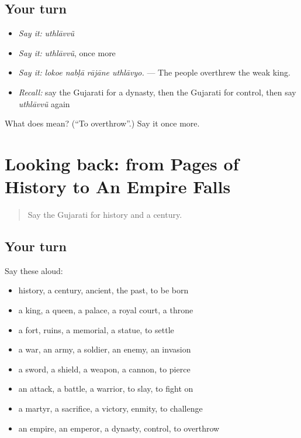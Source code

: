 \subsection*{Your turn}
\begin{itemize}
\raggedright
  \item \emph{Say it:} \emph{uthlāvvũ}
  \item \emph{Say it:} \emph{uthlāvvũ}, once more
  \item \emph{Say it:} \emph{lokoe nabḷā rājāne uthlāvyo.} — The people overthrew the weak king.
  \item \emph{Recall:} say the Gujarati for a dynasty, then the Gujarati for control, then say \emph{uthlāvvũ} again
\end{itemize}

\begin{tcolorbox}[breakable,colback=teal!4,colframe=teal!35!black,title={Before you move on}]
What does  mean? (\textquotedblleft{}To overthrow\textquotedblright{}.) Say it once more.
\end{tcolorbox}
\section[(dialogue)]{Looking back: from Pages of History to An Empire Falls}

\label{lesson:GU-R324-review-317-324}



\begin{quote}
Say the Gujarati for history and a century.
\end{quote}

\subsection*{Your turn}
Say these aloud:

\begin{itemize}
\raggedright
  \item history, a century, ancient, the past, to be born
  \item a king, a queen, a palace, a royal court, a throne
  \item a fort, ruins, a memorial, a statue, to settle
  \item a war, an army, a soldier, an enemy, an invasion
  \item a sword, a shield, a weapon, a cannon, to pierce
  \item an attack, a battle, a warrior, to slay, to fight on
  \item a martyr, a sacrifice, a victory, enmity, to challenge
  \item an empire, an emperor, a dynasty, control, to overthrow
\end{itemize}

